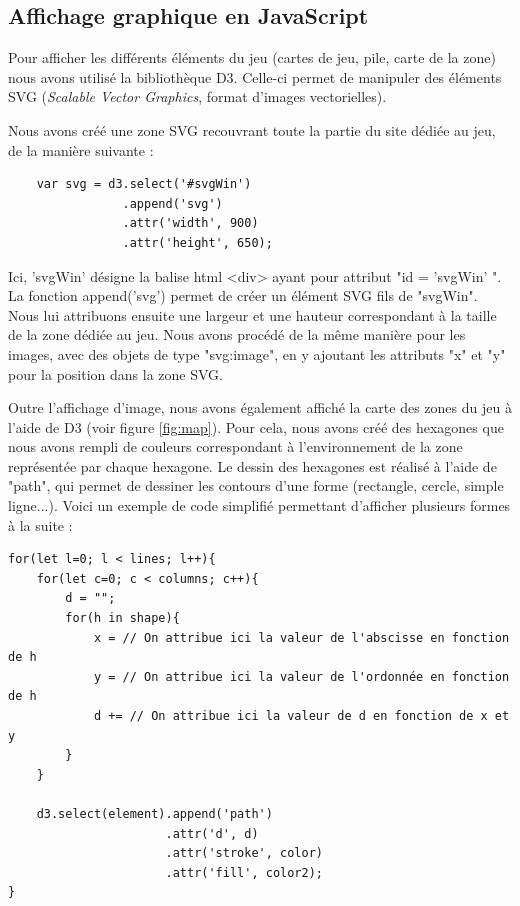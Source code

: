 \documentclass[12pt]{report}
\begin{document}
    \subsection{Affichage graphique en JavaScript}
		Pour afficher les différents éléments du jeu (cartes de jeu, pile, carte de la zone) nous avons utilisé la bibliothèque D3. Celle-ci permet de manipuler des éléments SVG (\textit{Scalable Vector Graphics}, format d'images vectorielles).

    Nous avons créé une zone SVG recouvrant toute la partie du site dédiée au jeu, de la manière suivante :

    \begin{verbatim}
    var svg = d3.select('#svgWin')
                .append('svg')
                .attr('width', 900)
                .attr('height', 650);
    \end{verbatim}

    Ici, 'svgWin' désigne la balise html \textless{}div\textgreater{} ayant pour attribut "id = 'svgWin' ". La fonction append('svg') permet de créer un élément SVG fils de "svgWin". Nous lui attribuons ensuite une largeur et une hauteur correspondant à la taille de la zone dédiée au jeu. Nous avons procédé de la même manière pour les images, avec des objets de type "svg:image", en y ajoutant les attributs "x" et "y" pour la position dans la zone SVG.

    Outre l'affichage d'image, nous avons également affiché la carte des zones du jeu à l'aide de D3 (voir figure \ref{fig:map}). Pour cela, nous avons créé des hexagones que nous avons rempli de couleurs correspondant à l'environnement de la zone représentée par chaque hexagone. Le dessin des hexagones est réalisé à l'aide de "path", qui permet de dessiner les contours d'une forme (rectangle, cercle, simple ligne...). Voici un exemple de code simplifié permettant d'afficher plusieurs formes à la suite :

	\begin{verbatim}
for(let l=0; l < lines; l++){
    for(let c=0; c < columns; c++){
        d = "";
        for(h in shape){
            x = // On attribue ici la valeur de l'abscisse en fonction de h
            y = // On attribue ici la valeur de l'ordonnée en fonction de h
            d += // On attribue ici la valeur de d en fonction de x et y
        }
    }

    d3.select(element).append('path')
                      .attr('d', d)
                      .attr('stroke', color)
                      .attr('fill', color2);
}
	\end{verbatim}
\end{document}
